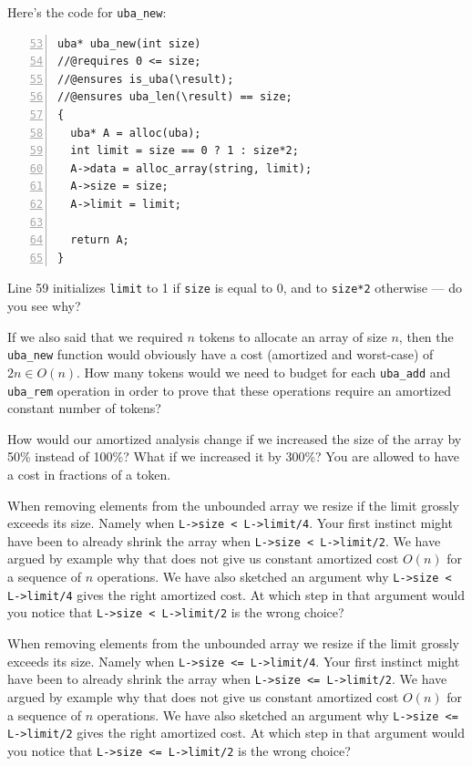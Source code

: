\begin{exercise}
  Here's the code for \lstinline'uba_new':
\begin{lstlisting}[language={[C0]C}, numbers=left, firstnumber=53]
uba* uba_new(int size)
//@requires 0 <= size;
//@ensures is_uba(\result);
//@ensures uba_len(\result) == size;
{
  uba* A = alloc(uba);
  int limit = size == 0 ? 1 : size*2;
  A->data = alloc_array(string, limit);
  A->size = size;
  A->limit = limit;

  return A;
}
\end{lstlisting}
Line 59 initializes \lstinline'limit' to 1 if
\lstinline'size' is equal to 0, and to \lstinline'size*2' otherwise
--- do you see why?

  If we also said that we required $n$ tokens to allocate an array of
  size $n$, then the \lstinline'uba_new' function would obviously have
  a cost (amortized and worst-case) of $2n \in O(n)$.  How many tokens
  would we need to budget for each \lstinline'uba_add' and
  \lstinline'uba_rem' operation in order to prove that these
  operations require an amortized constant number of tokens?
\end{exercise}

\begin{exercise}
  How would our amortized analysis change if we increased the size of
  the array by 50\% instead of 100\%? What if we increased it by
  300\%? You are allowed to have a cost in fractions of a token.
\end{exercise}

\begin{exercise}
  When removing elements from the unbounded array we resize if the
  limit grossly exceeds its size. Namely when %
  \lstinline'L->size < L->limit/4'.  %
  Your first instinct might have been to already shrink the array when
  \lstinline'L->size < L->limit/2'.  We have argued by example why
  that does not give us constant amortized cost $O(n)$ for a sequence
  of $n$ operations.  We have also sketched an argument why
  \lstinline'L->size < L->limit/4' gives the right amortized cost.  At
  which step in that argument would you notice that %
  \lstinline'L->size < L->limit/2' %
  is the wrong choice?
\end{exercise}

\begin{exercise}
  When removing elements from the unbounded array we resize if the limit
  grossly exceeds its size. Namely when \lstinline'L->size <= L->limit/4'.
  Your first instinct might have been to already shrink the array when
  \lstinline'L->size <= L->limit/2'.  We have argued by example why that does
  not give us constant amortized cost $O(n)$ for a sequence of $n$ operations.
  We have also sketched an argument why \lstinline'L->size <= L->limit/2'
  gives the right amortized cost.  At which step in that argument would you
  notice that \lstinline'L->size <= L->limit/2' is the wrong choice?
\end{exercise}

% 
% 
